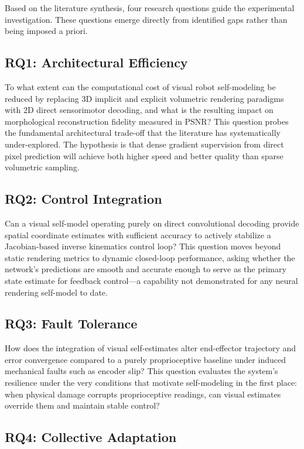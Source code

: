 \documentclass[12pt,a4paper,oneside]{report}
\begin{document}
Based on the literature synthesis, four research questions guide the experimental investigation. These questions emerge directly from identified gaps rather than being imposed a priori.

\subsection{RQ1: Architectural Efficiency}

To what extent can the computational cost of visual robot self-modeling be reduced by replacing 3D implicit and explicit volumetric rendering paradigms with 2D direct sensorimotor decoding, and what is the resulting impact on morphological reconstruction fidelity measured in PSNR? This question probes the fundamental architectural trade-off that the literature has systematically under-explored. The hypothesis is that dense gradient supervision from direct pixel prediction will achieve both higher speed and better quality than sparse volumetric sampling.

\subsection{RQ2: Control Integration}

Can a visual self-model operating purely on direct convolutional decoding provide spatial coordinate estimates with sufficient accuracy to actively stabilize a Jacobian-based inverse kinematics control loop? This question moves beyond static rendering metrics to dynamic closed-loop performance, asking whether the network's predictions are smooth and accurate enough to serve as the primary state estimate for feedback control---a capability not demonstrated for any neural rendering self-model to date.

\subsection{RQ3: Fault Tolerance}

How does the integration of visual self-estimates alter end-effector trajectory and error convergence compared to a purely proprioceptive baseline under induced mechanical faults such as encoder slip? This question evaluates the system's resilience under the very conditions that motivate self-modeling in the first place: when physical damage corrupts proprioceptive readings, can visual estimates override them and maintain stable control?

\subsection{RQ4: Collective Adaptation}
\end{document}
